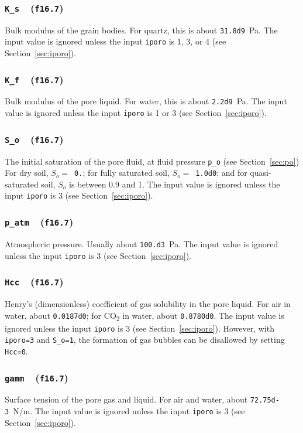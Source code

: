 \documentclass[letterpaper,11pt]{article}
\newcommand{\Var}[2]{\texttt{#1}\ \  (\texttt{#2})}
\begin{document}
\subsubsection[\texttt{K\_s}]{\Var{K\_s}{f16.7}}\label{sec:Ks}
Bulk modulus of the grain bodies.
For quartz, this is about \texttt{31.8d9}~Pa.
The input value is ignored unless the input
\texttt{iporo} is 1, 3, or 4 (see Section~\ref{sec:iporo}).
%
\subsubsection[\texttt{K\_f}]{\Var{K\_f}{f16.7}}\label{sec:Kf}
Bulk modulus of the pore liquid.
For water, this is about \texttt{2.2d9}~Pa.
The input value is ignored unless the input
\texttt{iporo} is 1 or 3 (see Section~\ref{sec:iporo}).
%
\subsubsection[\texttt{S\_o}]{\Var{S\_o}{f16.7}}\label{sec:So}
The initial saturation of the pore fluid,
at fluid pressure \texttt{p\_o}
(see Section~\ref{sec:po})
For dry soil, $S_o = $~\texttt{0.};
for fully saturated soil, $S_o = $~\texttt{1.0d0};
and for quasi-saturated soil, $S_o$ is between
0.9 and 1.
The input value is ignored unless the input
\texttt{iporo} is 3 (see Section~\ref{sec:iporo}).
%
\subsubsection[\texttt{p\_atm}]{\Var{p\_atm}{f16.7}}\label{sec:patm}
Atmospheric pressure.
Usually about \texttt{100.d3}~Pa.
The input value is ignored unless the input
\texttt{iporo} is 3 (see Section~\ref{sec:iporo}).
%
\subsubsection[\texttt{Hcc}]{\Var{Hcc}{f16.7}}\label{sec:Hcc}
Henry's (dimensionless) coefficient of gas solubility
in the pore liquid.
For air in water, about \texttt{0.0187d0};
for CO\textsubscript{2} in water, about \texttt{0.8780d0}.
The input value is ignored unless the input
\texttt{iporo} is 3 (see Section~\ref{sec:iporo}).
However, with \texttt{iporo=3} and \texttt{S\_o=1},
the formation of gas
bubbles can be disallowed by setting \texttt{Hcc=0}.
%
\subsubsection[\texttt{gamm}]{\Var{gamm}{f16.7}}\label{sec:gamm}
Surface tension of the pore gas and liquid.
For air and water, about \texttt{72.75d-3}~N/m.
The input value is ignored unless the input
\texttt{iporo} is 3 (see Section~\ref{sec:iporo}).
%
\end{document}
